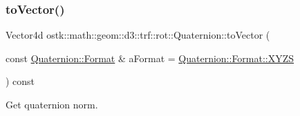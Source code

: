 \subsubsection{\texorpdfstring{to\+Vector()}{toVector()}}
{\footnotesize\ttfamily Vector4d ostk\+::math\+::geom\+::d3\+::trf\+::rot\+::\+Quaternion\+::to\+Vector (\begin{DoxyParamCaption}\item[{const \hyperlink{classostk_1_1math_1_1geom_1_1d3_1_1trf_1_1rot_1_1_quaternion_aa7a75f0dd505a58236ee355959e00bfd}{Quaternion\+::\+Format} \&}]{a\+Format = {\ttfamily \hyperlink{classostk_1_1math_1_1geom_1_1d3_1_1trf_1_1rot_1_1_quaternion_aa7a75f0dd505a58236ee355959e00bfda11c51ecd5dc6f86ba3c1ae79e21482f5}{Quaternion\+::\+Format\+::\+X\+Y\+ZS}} }\end{DoxyParamCaption}) const}



Get quaternion norm. 



